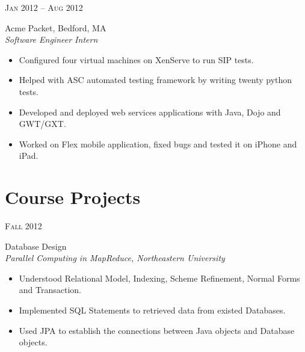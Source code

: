 \documentclass[10pt]{article} %
\begin{document}
{\begin{minipage}[t]{0.5\textwidth}
{\raggedleft\textsc{Jan 2012 -- Aug 2012}\par}

{\raggedright\large Acme Packet, Bedford, MA\\
\textit{Software Engineer Intern}\\[5pt]}

\begin{itemize}
    \item Configured four virtual machines on XenServe to run SIP tests.\vspace*{-8pt}
	\item Helped with ASC automated testing framework by writing twenty python tests.\vspace*{-8pt}
		\item Developed and deployed web services applications with Java, Dojo and GWT/GXT.\vspace*{-8pt}
    \item Worked on Flex mobile application, fixed bugs and tested it on iPhone and iPad.
\end{itemize}



\section{Course Projects} 


{\raggedleft\textsc{Fall 2012}\par}

{\raggedright\large Database Design\\
\textit{Parallel Computing in MapReduce, Northeastern University}\\[5pt]}


\begin{itemize}
      \item Understood Relational Model, Indexing, Scheme Refinement, Normal Forms and Transaction.\vspace*{-8pt}
      \item Implemented SQL Statements to retrieved data from existed Databases.\vspace*{-8pt}
      \item Used JPA to establish the connections between Java objects and Database objects.
\end{itemize}




\end{minipage}}
\end{document}
